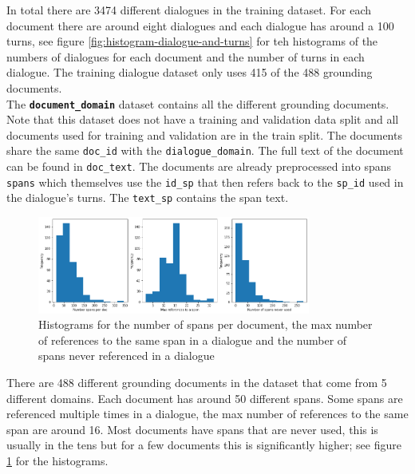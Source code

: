 \documentclass[11pt]{article}
\begin{document}
    In total there are 3474 different dialogues in the training dataset. For each document there are around eight dialogues and
    each dialogue has around a 100 turns, see figure \ref{fig:histogram-dialogue-and-turns} for teh histograms of the numbers of
    dialogues for each document and the number of turns in each dialogue.
    The training dialogue dataset only uses 415 of the 488 grounding documents.\\

    The \textbf{\texttt{document\_domain}} dataset contains all the different grounding documents. Note that this dataset does not have
    a training and validation data split and all documents used for training and validation are in the train split.
    The documents share the same \texttt{doc\_id} with the \texttt{dialogue\_domain}. The full text of the document
    can be found in \texttt{doc\_text}. The documents are already preprocessed into spans \texttt{spans} which themselves
    use the \texttt{id\_sp} that then refers back to the \texttt{sp\_id} used in the dialogue's turns. The \texttt{text\_sp}
    contains the span text.

    \begin{figure}[h]
        \centering
        \includegraphics[width=0.8\textwidth]{span_counts}
        \caption{Histograms for the number of spans per document, the max number of references to the same span in a dialogue and the number of
        spans never referenced in a dialogue }
        \label{fig:histogram-spans}
    \end{figure}

    There are 488 different grounding documents in the dataset that come from 5 different domains. Each document has
    around 50 different spans. Some spans are referenced multiple times in a dialogue, the max number of references
    to the same span are around 16. Most documents have spans that are never used, this is usually in the tens but for a few documents
    this is significantly higher; see figure \ref{fig:histogram-spans} for the histograms.
\end{document}
